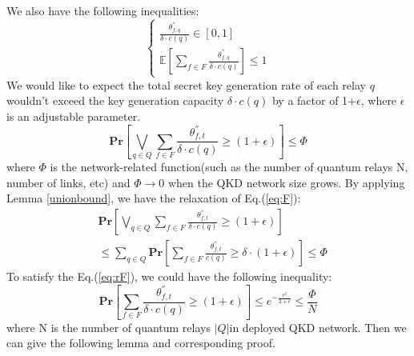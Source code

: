 {We also have the following inequalities:
\begin{equation}
\begin{cases}
\frac{\theta^{''}_{f,q}}{\delta \cdot c(q)} \in [0,1]\\
\mathbb{E}[\sum_{f \in F}\frac{\theta^{''}_{f,q}}{\delta \cdot c(q)}] \le 1 
\end{cases}
\end{equation} 
We would like to expect the total secret key generation rate of each relay $q$ wouldn't exceed the key generation capacity $\delta \cdot c(q)$ by a factor of 1+$\epsilon$, where $\epsilon$ is an adjustable parameter. 
\begin{equation}\label{eq:F}
\textbf{Pr}[\bigvee_{q \in Q}\sum_{f \in F} \frac{\theta^{''}_{f,t}}{\delta \cdot c(q)} \ge (1+\epsilon)] \le \Phi
\end{equation}\label{eq:rF}
where $\Phi$ is the network-related function(such as the number of quantum relays N, number of links, etc) and $\Phi \rightarrow 0$ when the QKD network size grows. By applying Lemma \ref{unionbound}, we have the relaxation of Eq.(\ref{eq:F}):
\begin{equation}
\begin{aligned}
&\textbf{Pr}[\bigvee_{q \in Q}\sum_{f \in F} \frac{\theta^{''}_{f,t}}{\delta \cdot c(q)} \ge (1+\epsilon)] \\
&\le \sum_{q \in Q} \textbf{Pr}[\sum_{f \in F} \frac{\theta^{''}_{f,t}}{c(q)} \ge \delta \cdot (1+\epsilon)] \le \Phi
\end{aligned}
\end{equation} 
To satisfy the Eq.(\ref{eq:rF}), we could have the following inequality:
\begin{equation}
\textbf{Pr}[\sum_{f \in F} \frac{\theta^{''}_{f,t}}{\delta \cdot c(q)} \ge  (1+\epsilon)] \le e^{-\frac{\epsilon^2}{2+\epsilon}} \le \frac{\Phi}{N}
\end{equation}
where N is the number of quantum relays $|Q|$in deployed QKD network. Then we can give the following lemma and corresponding proof.

}

